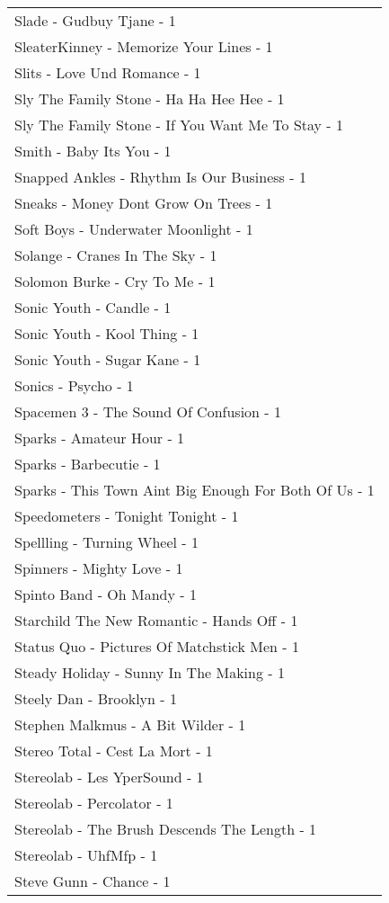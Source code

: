 \documentclass[
]{article}
\begin{document}
\begin{longtable}{l}
Slade - Gudbuy Tjane - 1 \\ 
SleaterKinney - Memorize Your Lines - 1 \\ 
Slits - Love Und Romance - 1 \\ 
Sly The Family Stone - Ha Ha Hee Hee - 1 \\ 
Sly The Family Stone - If You Want Me To Stay - 1 \\ 
Smith - Baby Its You - 1 \\ 
Snapped Ankles - Rhythm Is Our Business - 1 \\ 
Sneaks - Money Dont Grow On Trees - 1 \\ 
Soft Boys - Underwater Moonlight - 1 \\ 
Solange - Cranes In The Sky - 1 \\ 
Solomon Burke - Cry To Me - 1 \\ 
Sonic Youth - Candle - 1 \\ 
Sonic Youth - Kool Thing - 1 \\ 
Sonic Youth - Sugar Kane - 1 \\ 
Sonics - Psycho - 1 \\ 
Spacemen 3 - The Sound Of Confusion - 1 \\ 
Sparks - Amateur Hour - 1 \\ 
Sparks - Barbecutie - 1 \\ 
Sparks - This Town Aint Big Enough For Both Of Us - 1 \\ 
Speedometers - Tonight Tonight - 1 \\ 
Spellling - Turning Wheel - 1 \\ 
Spinners - Mighty Love - 1 \\ 
Spinto Band - Oh Mandy - 1 \\ 
Starchild The New Romantic - Hands Off - 1 \\ 
Status Quo - Pictures Of Matchstick Men - 1 \\ 
Steady Holiday - Sunny In The Making - 1 \\ 
Steely Dan - Brooklyn - 1 \\ 
Stephen Malkmus - A Bit Wilder - 1 \\ 
Stereo Total - Cest La Mort - 1 \\ 
Stereolab - Les YperSound - 1 \\ 
Stereolab - Percolator - 1 \\ 
Stereolab - The Brush Descends The Length - 1 \\ 
Stereolab - UhfMfp - 1 \\ 
Steve Gunn - Chance - 1 \\ 

\end{longtable}
\end{document}
